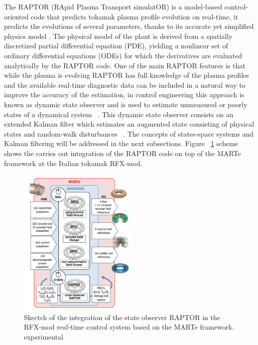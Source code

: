 The RAPTOR (RApid Plasma Transport simulatOR)  is a model-based control-oriented code that predicts tokamak plasma profile evolution on real-time, it predicts the evolutions of several parameters, thanks to its accurate yet simplified physics model \cite{Raptor}. The physical model of the plant is derived from a spatially discretized partial differential equation (PDE), yielding a nonlinear set of ordinary differential equations (ODEs) for which the derivatives are evaluated analytically by the RAPTOR code. One of the main RAPTOR features is that  while the plasma is evolving RAPTOR has full knowledge of the plasma profiles and the available real-time diagnostic data can be included in a natural way to improve the accuracy of the estimation, in control engineering this approach is known as dynamic state observer and is used to estimate unmeasured or  poorly states of a dynamical system ~\cite{RAPTOR2011}. This dynamic state observer consists on an extended Kalman filter which estimates an augmented state consisting of physical states and random-walk disturbances  ~\cite{RAPTOR2014}. The concepts of  states-space systems and Kalman filtering will be addressed in the next subsections.  Figure ~\ref{RaptorMARTe} scheme shows  the carries out  integration of the RAPTOR code on top of the MARTe framework at the Italian tokamak RFX-mod.
\smallskip

\begin{figure}[htbp]
	\centering
	\includegraphics[width=0.505\textwidth]{Chp2/raptorMARTe.png}
	\caption{\label{RaptorMARTe} Skectch of the integration of the state observer RAPTOR in the RFX-mod real-time control system based on the MARTe framework.
		experimental \cite{Raptor}}
	
\end{figure}


